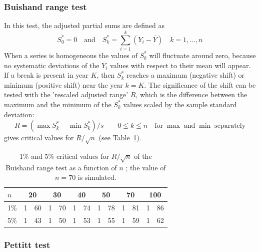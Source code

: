 \documentclass[a4paper,11pt]{article}
\begin{document}
\subsubsection{Buishand range test}
\label{sec:bhr}

In this test, the adjusted partial sums are defined as
\begin{equation*}
S_0^* = 0 \quad \mathrm{and} \quad S_k^* = \sum_{i=1}^{k}(Y_i -
\bar{Y}) \quad k=1,\ldots,n
\end{equation*}
When a series is homogeneous the values of $S_k^*$ will fluctuate
around zero, because no systematic deviations of the $Y_i$ values with
respect to their mean will appear. If a break is present in year $K$,
then $S_k^*$ reaches a maximum (negative shift) or minimum (positive
shift) near the year $k=K$.  The significance of the shift can be
tested with the 'rescaled adjusted range' $R$, which is the difference
between the maximum and the minimum of the $S_k^*$ values scaled by
the sample standard deviation:
\begin{equation*}
R = ( \max{S_k^*} - \min{S_k^*})/s \qquad 0 \leq k \leq n \quad
\mathrm{for}\;\max\;\mathrm{and}\;\min\;\mathrm{separately}
\end{equation*}
\citet{buishand1982} gives critical values for $R/\sqrt{n}$ (see
Table~\ref{tab:bhr}).

\begin{table}[!ht]
\begin{center}
\caption{1\% and 5\% critical values for $R/\sqrt{n}$ of the Buishand
range test as a function of $n$ \citep{buishand1982}; the value of
$n=70$ is simulated.}
\label{tab:bhr}
\begin{tabular}{l r@{.}l r@{.}l r@{.}l r@{.}l r@{.}l r@{.}l}
\hline
$n$ & \multicolumn{2}{c}{20} & \multicolumn{2}{c}{30} & \multicolumn{2}{c}{40} & \multicolumn{2}{c}{50} & \multicolumn{2}{c}{70} & \multicolumn{2}{c}{100}\\
\hline
1\% & 1&60 & 1&70 & 1&74 & 1&78 & 1&81 & 1&86\\
5\% & 1&43 & 1&50 & 1&53 & 1&55 & 1&59 & 1&62\\
\end{tabular}
\end{center}
\end{table}


\subsubsection{Pettitt test}
\label{sec:pet}
\end{document}
